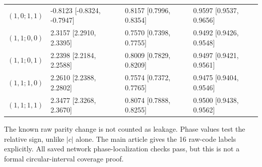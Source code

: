 \documentclass[10pt,a4paper]{article}
\begin{document}
\begin{table}[htbp]
\begin{tabular}{llll}
$(1,0;1,1)$ & -0.8123 [-0.8324, -0.7947] & 0.8157 [0.7996, 0.8354] & 0.9597 [0.9537, 0.9656] \\
$(1,1;0,0)$ & 2.3157 [2.2910, 2.3395] & 0.7570 [0.7398, 0.7755] & 0.9492 [0.9426, 0.9548] \\
$(1,1;0,1)$ & 2.2398 [2.2184, 2.2588] & 0.8009 [0.7829, 0.8209] & 0.9497 [0.9421, 0.9561] \\
$(1,1;1,0)$ & 2.2610 [2.2388, 2.2802] & 0.7574 [0.7372, 0.7765] & 0.9475 [0.9404, 0.9546] \\
$(1,1;1,1)$ & 2.3477 [2.3268, 2.3670] & 0.8074 [0.7888, 0.8255] & 0.9500 [0.9438, 0.9562] \\
\bottomrule\end{tabular}\end{table}\par
The known raw parity change is not counted as leakage. Phase values test the relative sign, unlike $|c|$ alone. The main article gives the 16 raw-code labels explicitly. All saved network phase-localization checks pass, but this is not a formal circular-interval coverage proof.\clearpage
\end{document}
